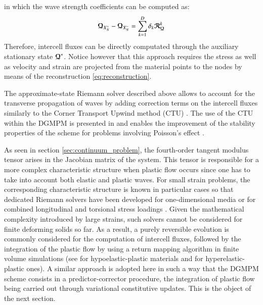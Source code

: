 in which the wave strength coefficients can be computed as:
\begin{equation}
  \label{eq:delta_U}
  {\boldsymbol{\mathcal{Q}}}_{X_N^+} - {\boldsymbol{\mathcal{Q}}}_{X_N^-} = \sum_{k=1}^D \delta_k{\boldsymbol{\mathcal{R}}}_{\boldsymbol{\mathcal{Q}}}^k
\end{equation}
Therefore, intercell fluxes can be directly computated through the auxiliary stationary state ${\boldsymbol{\mathcal{Q}}}^*$.
Notice however that this approach requires the stress as well as velocity and strain are projected from the material points to the nodes by means of the reconstruction \eqref{eq:reconstruction}.


\begin{remark}
  The approximate-state Riemann solver described above allows to account for the transverse propagation of waves by adding correction terms on the intercell fluxes similarly to the Corner Transport Upwind method (CTU) \cite{Colella_CTU}.
  The use of the CTU within the DGMPM is presented in \cite{DGMPM} and enables the improvement of the stability properties of the scheme for problems involving Poisson's effect \cite{Thesis}.
\end{remark}


As seen in section \ref{sec:continuum_problem}, the fourth-order tangent modulus tensor arises in the Jacobian matrix of the system.
This tensor is responsible for a more complex characteristic structure when plastic flow occurs since one has to take into account both elastic and plastic waves.
For small strain problems, the corresponding characteristic structure is known in particular cases so that dedicated Riemann solvers have been developed for one-dimensional media \cite{Thomas_EP} or for combined longitudinal and torsional stress loadings \cite{Lin_et_Ballman}.
Given the mathematical complexity introduced by large strains, such solvers cannot be considered for finite deforming solids so far.
As a result, a purely reversible evolution is commonly considered for the computation of intercell fluxes, followed by the integration of the plastic flow by using a return mapping algorithm in finite volume simulations (see \cite{FRRSE,Maire_elastoplast} for hypoelastic-plastic materials and \cite{Lee_FVM} for hyperelastic-plastic ones).
A similar approach is adopted here in such a way that the DGMPM scheme consists in a predictor-corrector procedure, the integration of plastic flow being carried out through variational constitutive updates.
This is the object of the next section.


